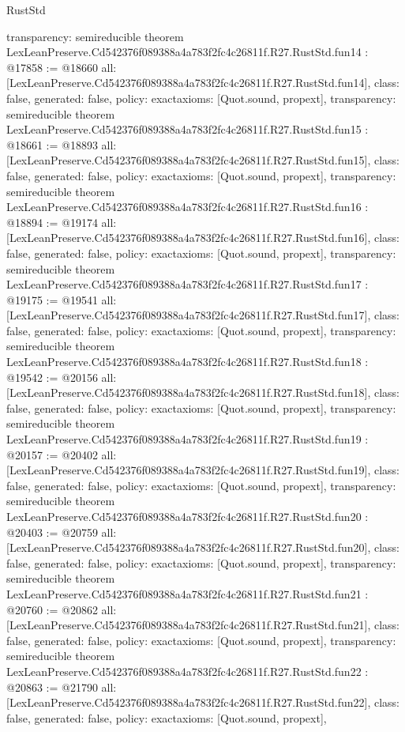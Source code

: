 \begin{lexlean}{RustStd}
\begin{coremodule}
{  transparency: semireducible
}
theorem LexLeanPreserve.Cd542376f089388a4a783f2fc4c26811f.R27.RustStd.fun14 : @17858 := @18660 {
  all: [LexLeanPreserve.Cd542376f089388a4a783f2fc4c26811f.R27.RustStd.fun14],
  class: false,
  generated: false,
  policy: exact{axioms: [Quot.sound, propext]},
  transparency: semireducible
}
theorem LexLeanPreserve.Cd542376f089388a4a783f2fc4c26811f.R27.RustStd.fun15 : @18661 := @18893 {
  all: [LexLeanPreserve.Cd542376f089388a4a783f2fc4c26811f.R27.RustStd.fun15],
  class: false,
  generated: false,
  policy: exact{axioms: [Quot.sound, propext]},
  transparency: semireducible
}
theorem LexLeanPreserve.Cd542376f089388a4a783f2fc4c26811f.R27.RustStd.fun16 : @18894 := @19174 {
  all: [LexLeanPreserve.Cd542376f089388a4a783f2fc4c26811f.R27.RustStd.fun16],
  class: false,
  generated: false,
  policy: exact{axioms: [Quot.sound, propext]},
  transparency: semireducible
}
theorem LexLeanPreserve.Cd542376f089388a4a783f2fc4c26811f.R27.RustStd.fun17 : @19175 := @19541 {
  all: [LexLeanPreserve.Cd542376f089388a4a783f2fc4c26811f.R27.RustStd.fun17],
  class: false,
  generated: false,
  policy: exact{axioms: [Quot.sound, propext]},
  transparency: semireducible
}
theorem LexLeanPreserve.Cd542376f089388a4a783f2fc4c26811f.R27.RustStd.fun18 : @19542 := @20156 {
  all: [LexLeanPreserve.Cd542376f089388a4a783f2fc4c26811f.R27.RustStd.fun18],
  class: false,
  generated: false,
  policy: exact{axioms: [Quot.sound, propext]},
  transparency: semireducible
}
theorem LexLeanPreserve.Cd542376f089388a4a783f2fc4c26811f.R27.RustStd.fun19 : @20157 := @20402 {
  all: [LexLeanPreserve.Cd542376f089388a4a783f2fc4c26811f.R27.RustStd.fun19],
  class: false,
  generated: false,
  policy: exact{axioms: [Quot.sound, propext]},
  transparency: semireducible
}
theorem LexLeanPreserve.Cd542376f089388a4a783f2fc4c26811f.R27.RustStd.fun20 : @20403 := @20759 {
  all: [LexLeanPreserve.Cd542376f089388a4a783f2fc4c26811f.R27.RustStd.fun20],
  class: false,
  generated: false,
  policy: exact{axioms: [Quot.sound, propext]},
  transparency: semireducible
}
theorem LexLeanPreserve.Cd542376f089388a4a783f2fc4c26811f.R27.RustStd.fun21 : @20760 := @20862 {
  all: [LexLeanPreserve.Cd542376f089388a4a783f2fc4c26811f.R27.RustStd.fun21],
  class: false,
  generated: false,
  policy: exact{axioms: [Quot.sound, propext]},
  transparency: semireducible
}
theorem LexLeanPreserve.Cd542376f089388a4a783f2fc4c26811f.R27.RustStd.fun22 : @20863 := @21790 {
  all: [LexLeanPreserve.Cd542376f089388a4a783f2fc4c26811f.R27.RustStd.fun22],
  class: false,
  generated: false,
  policy: exact{axioms: [Quot.sound, propext]},
}
\end{coremodule}
\end{lexlean}
